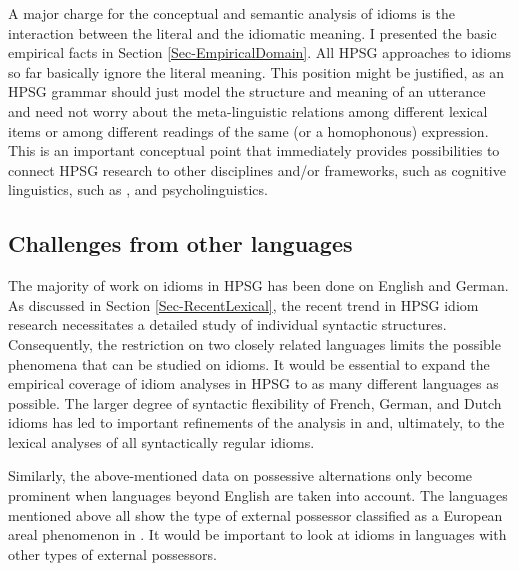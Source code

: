 \documentclass[output=paper]{langsci/langscibook}
\begin{document}
\bigskip%
A major charge for the conceptual and semantic analysis of idioms is the interaction between the literal and the idiomatic meaning. 
I presented the basic empirical facts in Section \ref{Sec-EmpiricalDomain}. 
All HPSG approaches to idioms so far basically ignore the literal meaning.
This position might be justified, as  an HPSG grammar should just model the structure and meaning of an utterance and need not worry about the meta-linguistic relations among different lexical items or among different readings of the same (or a homophonous) expression.
This is an important conceptual point that immediately provides possibilities to connect HPSG research to other disciplines and/or frameworks, such as cognitive linguistics, such as \cite{Dobrovolskij:Piirainen:05}, and psycholinguistics.




\subsection{Challenges from other languages}
\label{Sec-OtherLanguages}

The majority of work on idioms in HPSG has been done on English and German. 
As discussed in Section \ref{Sec-RecentLexical}, the recent trend in HPSG idiom research necessitates a detailed study of individual syntactic structures. 
Consequently, the restriction on two closely related languages limits the possible phenomena that can be studied on idioms. 
It would be essential to expand the empirical coverage of idiom analyses in HPSG to as many different languages as possible. 
The larger degree of syntactic flexibility of French, German, and Dutch idioms \citep{Ruwet:91,NSW94a,Schenk:95} has led to important refinements of the analysis in \cite{NSW94a} and, ultimately, to the lexical analyses of all syntactically regular idioms. 

Similarly, the above-mentioned data on possessive alternations only become prominent when languages beyond English are taken into account. The languages mentioned above  all show the type of external possessor classified as a European areal phenomenon in \cite{Haspelmath:99}. 
It would be important to look at idioms in languages with other types of external possessors.
\end{document}
